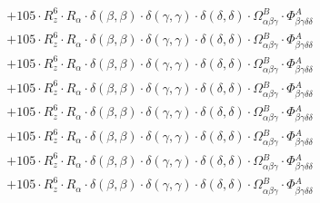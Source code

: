 \documentclass{article}
\begin{document}
\begin{subequations}
\begin{gather}
\begin{array}{c}
 \\[0.2em] 		 + 105 \cdot R_{z}^{6} \cdot R_{\alpha{}} \cdot \delta{}\left(\beta{}, \beta{}\right) \cdot \delta{}\left(\gamma{}, \gamma{}\right) \cdot \delta{}\left(\delta{}, \delta{}\right) \cdot \Omega{}^{B}_{\alpha{}\beta{}\gamma{}} \cdot \Phi{}^{A}_{\beta{}\gamma{}\delta{}\delta{}} 
 \\[0.2em] 		 + 105 \cdot R_{z}^{6} \cdot R_{\alpha{}} \cdot \delta{}\left(\beta{}, \beta{}\right) \cdot \delta{}\left(\gamma{}, \gamma{}\right) \cdot \delta{}\left(\delta{}, \delta{}\right) \cdot \Omega{}^{B}_{\alpha{}\beta{}\gamma{}} \cdot \Phi{}^{A}_{\beta{}\gamma{}\delta{}\delta{}} 
 \\[0.2em] 		 + 105 \cdot R_{z}^{6} \cdot R_{\alpha{}} \cdot \delta{}\left(\beta{}, \beta{}\right) \cdot \delta{}\left(\gamma{}, \gamma{}\right) \cdot \delta{}\left(\delta{}, \delta{}\right) \cdot \Omega{}^{B}_{\alpha{}\beta{}\gamma{}} \cdot \Phi{}^{A}_{\beta{}\gamma{}\delta{}\delta{}} 
 \\[0.2em] 		 + 105 \cdot R_{z}^{6} \cdot R_{\alpha{}} \cdot \delta{}\left(\beta{}, \beta{}\right) \cdot \delta{}\left(\gamma{}, \gamma{}\right) \cdot \delta{}\left(\delta{}, \delta{}\right) \cdot \Omega{}^{B}_{\alpha{}\beta{}\gamma{}} \cdot \Phi{}^{A}_{\beta{}\gamma{}\delta{}\delta{}} 
 \\[0.2em] 		 + 105 \cdot R_{z}^{6} \cdot R_{\alpha{}} \cdot \delta{}\left(\beta{}, \beta{}\right) \cdot \delta{}\left(\gamma{}, \gamma{}\right) \cdot \delta{}\left(\delta{}, \delta{}\right) \cdot \Omega{}^{B}_{\alpha{}\beta{}\gamma{}} \cdot \Phi{}^{A}_{\beta{}\gamma{}\delta{}\delta{}} 
 \\[0.2em] 		 + 105 \cdot R_{z}^{6} \cdot R_{\alpha{}} \cdot \delta{}\left(\beta{}, \beta{}\right) \cdot \delta{}\left(\gamma{}, \gamma{}\right) \cdot \delta{}\left(\delta{}, \delta{}\right) \cdot \Omega{}^{B}_{\alpha{}\beta{}\gamma{}} \cdot \Phi{}^{A}_{\beta{}\gamma{}\delta{}\delta{}} 
 \\[0.2em] 		 + 105 \cdot R_{z}^{6} \cdot R_{\alpha{}} \cdot \delta{}\left(\beta{}, \beta{}\right) \cdot \delta{}\left(\gamma{}, \gamma{}\right) \cdot \delta{}\left(\delta{}, \delta{}\right) \cdot \Omega{}^{B}_{\alpha{}\beta{}\gamma{}} \cdot \Phi{}^{A}_{\beta{}\gamma{}\delta{}\delta{}} 
 \\[0.2em] 		 + 105 \cdot R_{z}^{6} \cdot R_{\alpha{}} \cdot \delta{}\left(\beta{}, \beta{}\right) \cdot \delta{}\left(\gamma{}, \gamma{}\right) \cdot \delta{}\left(\delta{}, \delta{}\right) \cdot \Omega{}^{B}_{\alpha{}\beta{}\gamma{}} \cdot \Phi{}^{A}_{\beta{}\gamma{}\delta{}\delta{}} 

\end{array}
\end{gather}
\end{subequations}
\end{document}
